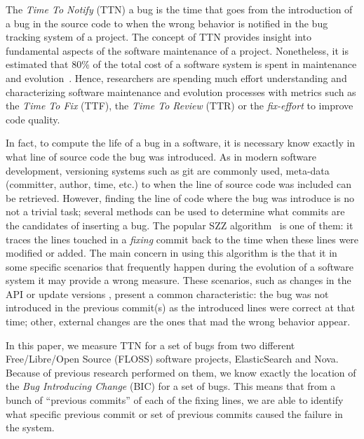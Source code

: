 \documentclass[10pt, conference]{IEEEtran}
\begin{document}
The \emph{Time To Notify} (TTN) a bug is the time that goes from the introduction of a bug in the source code to when the wrong behavior is notified in the bug tracking system of a project. The concept of TTN provides insight into fundamental aspects of the software maintenance of a project. Nonetheless, it is estimated that 80\% of the total cost of a software system is spent in maintenance and evolution~\cite{tassey2002economic}. Hence, researchers are spending much effort understanding and characterizing software maintenance and evolution processes with metrics such as the \emph{Time To Fix} (TTF), the \emph{Time To Review} (TTR) or the \emph{fix-effort} to improve code quality.

In fact, to compute the life of a bug in a software, it is necessary know exactly in what line of source code the bug was introduced. As in modern software development, versioning systems such as git are commonly used, meta-data (committer, author, time, etc.) to when the line of source code was included can be retrieved. However, finding the line of code where the bug was introduce is no not a trivial task; several methods can be used to determine what commits are the candidates of inserting a bug. The popular SZZ algorithm~\cite{sliwerski2005changes} is one of them: it traces the lines touched in a \emph{fixing} commit back to the time when these lines were modified or added. The main concern in using this algorithm is the that it in some specific scenarios that frequently happen during the evolution of a software system it may provide a wrong measure. These scenarios, such as changes in the API or update versions , present a common characteristic: the bug was not introduced in the  previous commit(s) as the introduced lines were correct at that time; other, external changes are the ones that mad the wrong behavior appear. 


In this paper, we measure TTN for a set of bugs from two different Free/Libre/Open Source (FLOSS) software projects, ElasticSearch and Nova. Because of previous research performed on them, we know exactly the location of the \emph{Bug Introducing Change} (BIC) for a set of bugs. This means that from a bunch of ``previous commits'' of each of the fixing lines, we are able to identify what specific previous commit or set of previous commits caused the failure in the system.
\end{document}
